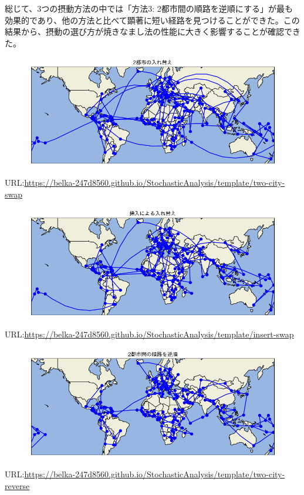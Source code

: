 \documentclass[a4paper,11pt]{ltjsarticle}
\begin{document}
総じて、3つの摂動方法の中では「方法3: 2都市間の順路を逆順にする」が最も効果的であり、他の方法と比べて顕著に短い経路を見つけることができた。この結果から、摂動の選び方が焼きなまし法の性能に大きく影響することが確認できた。
\begin{figure}[H]
    \begin{center}
        \includegraphics[scale=0.7]{img/two-city-swap.png}
    \end{center}
\end{figure}
URL:\url{https://belka-247d8560.github.io/StochasticAnalysis/template/two-city-swap}
\begin{figure}[H]
    \begin{center}
        \includegraphics[scale=0.7]{img/insert-swap.png}
    \end{center}
\end{figure}
URL:\url{https://belka-247d8560.github.io/StochasticAnalysis/template/insert-swap}
\begin{figure}[H]
    \begin{center}
        \includegraphics[scale=0.7]{img/two-city-reverse.png}
    \end{center}
\end{figure}
URL:\url{https://belka-247d8560.github.io/StochasticAnalysis/template/two-city-reverse}
\end{document}
